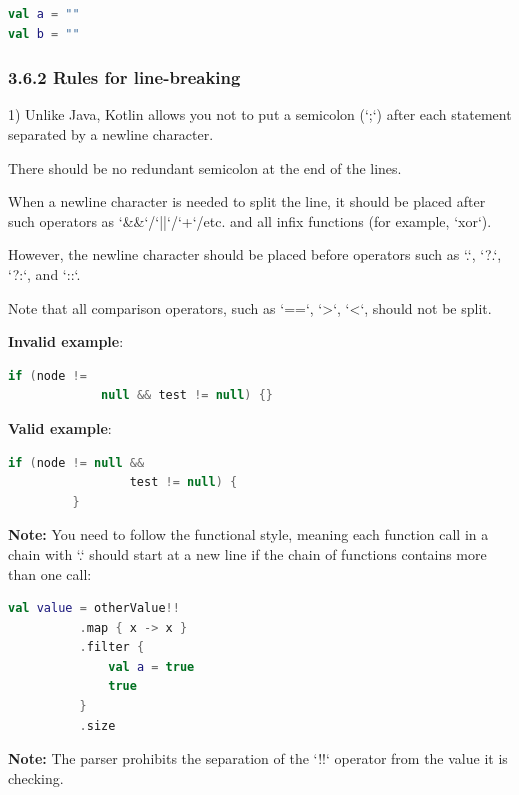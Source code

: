 {\begin{lstlisting}[language=Kotlin]
val a = ""
val b = ""
\end{lstlisting}


\subsubsection*{\textbf{3.6.2 Rules for line-breaking}}
\leavevmode\newline

\label{sec:3.6.2}



1) Unlike Java, Kotlin allows you not to put a semicolon (`;`) after each statement separated by a newline character.

    There should be no redundant semicolon at the end of the lines.

 

When a newline character is needed to split the line, it should be placed after such operators as `\&\&`/`||`/`+`/etc. and all infix functions (for example, `xor`).

However, the newline character should be placed before operators such as `.`, `?.`, `?:`, and `::`.



Note that all comparison operators, such as `==`, `>`, `<`, should not be split.



\textbf{Invalid example}: 

\begin{lstlisting}[language=Kotlin]
     if (node !=
             null && test != null) {}
\end{lstlisting}
 

\textbf{Valid example}: 

\begin{lstlisting}[language=Kotlin]
         if (node != null && 
                 test != null) {
         }
\end{lstlisting}
  

\textbf{Note:} You need to follow the functional style, meaning each function call in a chain with `.` should start at a new line if the chain of functions contains more than one call:

\begin{lstlisting}[language=Kotlin]
  val value = otherValue!!
          .map { x -> x }
          .filter {
              val a = true
              true
          }
          .size    
\end{lstlisting}
\textbf{Note:} The parser prohibits the separation of the `!!` operator from the value it is checking.



}
